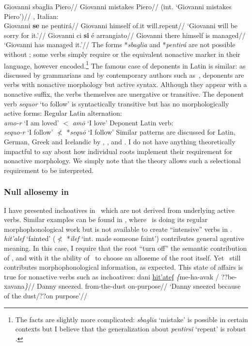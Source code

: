 	\a \ljudge{*} \begingl
		\gla Giovanni sbaglia Piero//
		\glb Giovanni mistakes Piero//
		\glft (int. `Giovanni mistakes Piero')//
	\endgl
\xe
\ex \citet[70]{burzio86}, Italian:\\
	\begingl
		\gla Giovanni \textbf{se} ne pentir\'a//
		\glb Giovanni himself of.it will.repent//
		\glft `Giovanni will be sorry for it.'//
	\endgl
\xe
\ex
	\begingl
		\gla Giovanni ci \textbf{si} \'e arrangiato//
		\glb Giovanni there himself is managed//
		\glft `Giovanni has managed it.'//
	\endgl
\xe
The forms *\emph{sbaglia} and *\emph{pentir\'a} are not possible without ; some verbs simply require  or the equivalent nonactive marker in their language, however encoded.\footnote{The facts are slightly more complicated: \emph{sbaglia} `mistake' is possible in certain contexts but I believe that the generalization about \emph{pentirsi} `repent' is robust \citep[40]{burzio86}.} The famous case of deponents in Latin is similar: as discussed by grammarians and by contemporary authors such as~\cite{aronoff94}, deponents are verbs with nonactive morphology but active syntax. Although they appear with a nonactive suffix, the verbs themselves are unergative or transitive. The deponent verb \emph{sequor} `to follow' is syntactically transitive but has no morphologically active forms:
\pex
    \a Regular Latin alternation:\\
        \emph{amo-r} `I am loved' $<$ \emph{am\=o} `I love'
    \a Deponent Latin verb:\\
        \emph{sequo-r} `I follow' $\nless$ *\emph{sequ\=o} `I follow'
\xe
Similar patterns are discussed for Latin, German, Greek and Icelandic by \cite{embick04}, \cite{kallulli13}, \cite{kastnerzu15li} and \cite{wood15springer}. I do not have anything theoretically impactful to say about how individual roots implement their requirement for nonactive morphology. We simply note that the theory allows such a {selectional requirement} to be interpreted.

		\subsubsection{Null allosemy in \thit} \label{syn:middle:nonactive:elena}
I have presented inchoatives in \tnif~which are not derived from underlying active verbs. Similar examples can be found in \thit, where \va~is doing its regular morphophonological work but is not available to create ``intensive'' verbs in \tpie.
\ex \emph{hit'alef} `fainted' ($\nless$ *\emph{ilef} `int. made someone faint')
\xe
{\va} contributes general agentive meaning. In this case, I require that the root ``turn off'' the semantic contribution of \va, and with it the ability of \va~to choose an alloseme of the root itself. Yet \va~still contributes morphophonological information, as expected. This state of affairs is true for nonactive verbs such as inchoatives:
\pex 
	\a \label{ex:incho1} \begingl
	\gla dani \underline{hit'ateʃ} \emph{\{}me-ha-avak / ??be-xavana\emph{\}}//
	\glb Danny sneezed. \phantom{\{}from-the-dust {} \phantom{??}on-purpose//
	\glft `Danny sneezed because of the dust/??on purpose'//
	\endgl
	
